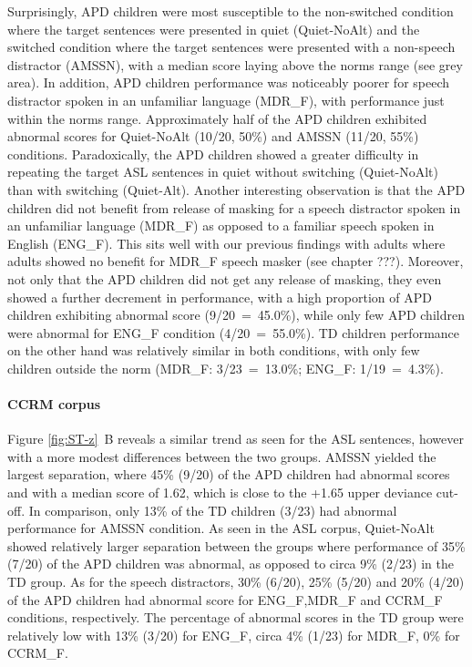 \documentclass[a4paper, twoside]{templates/ociamthesis}
\begin{document}
Surprisingly, APD children were most susceptible to the non-switched condition where the target sentences were presented in quiet (Quiet-NoAlt) and the switched condition where the target sentences were presented with a non-speech distractor (AMSSN), with a median score laying above the norms range (see grey area). In addition, APD children performance was noticeably poorer for speech distractor spoken in an unfamiliar language (MDR\_F), with performance just within the norms range. Approximately half of the APD children exhibited abnormal scores for Quiet-NoAlt (10/20, 50\%) and AMSSN (11/20, 55\%) conditions. Paradoxically, the APD children showed a greater difficulty in repeating the target ASL sentences in quiet without switching (Quiet-NoAlt) than with switching (Quiet-Alt). Another interesting observation is that the APD children did not benefit from release of masking for a speech distractor spoken in an unfamiliar language (MDR\_F) as opposed to a familiar speech spoken in English (ENG\_F). This sits well with our previous findings with adults where adults showed no benefit for MDR\_F speech masker (see chapter ???). Moreover, not only that the APD children did not get any release of masking, they even showed a further decrement in performance, with a high proportion of APD children exhibiting abnormal score (9/20~=~45.0\%), while only few APD children were abnormal for ENG\_F condition (4/20~=~55.0\%). TD children performance on the other hand was relatively similar in both conditions, with only few children outside the norm (MDR\_F: 3/23~=~13.0\%; ENG\_F: 1/19~=~4.3\%).

\hypertarget{ccrm-corpus}{%
\paragraph*{CCRM corpus}\label{ccrm-corpus}}

Figure \ref{fig:ST-z}~B reveals a similar trend as seen for the ASL sentences, however with a more modest differences between the two groups. AMSSN yielded the largest separation, where 45\% (9/20) of the APD children had abnormal scores and with a median score of 1.62, which is close to the +1.65 upper deviance cut-off. In comparison, only 13\% of the TD children (3/23) had abnormal performance for AMSSN condition. As seen in the ASL corpus, Quiet-NoAlt showed relatively larger separation between the groups where performance of 35\% (7/20) of the APD children was abnormal, as opposed to circa 9\% (2/23) in the TD group. As for the speech distractors, 30\% (6/20), 25\% (5/20) and 20\% (4/20) of the APD children had abnormal score for ENG\_F,MDR\_F and CCRM\_F conditions, respectively. The percentage of abnormal scores in the TD group were relatively low with 13\% (3/20) for ENG\_F, circa 4\% (1/23) for MDR\_F, 0\% for CCRM\_F.
\end{document}
